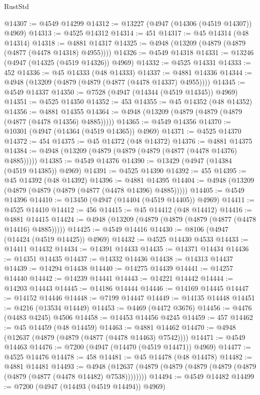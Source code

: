 \begin{lexlean}{RustStd}
\begin{coremodule}
@14307 := @4549 @14299
@14312 := @13227 (@4947 (@14306 (@4519 @14307)) @4969)
@14313 := @4525 @14312
@14314 := 451
@14317 := @45 @14314 (@48 @14314)
@14318 := @4881 @14317
@14325 := @4948 (@13209 (@4879 (@4879 (@4877 (@4478 @14318) @4955))))
@14326 := @4549 @14318
@14331 := @13246 (@4947 (@14325 (@4519 @14326)) @4969)
@14332 := @4525 @14331
@14333 := 452
@14336 := @45 @14333 (@48 @14333)
@14337 := @4881 @14336
@14344 := @4948 (@13209 (@4879 (@4879 (@4877 (@4478 @14337) @4955))))
@14345 := @4549 @14337
@14350 := @7528 (@4947 (@14344 (@4519 @14345)) @4969)
@14351 := @4525 @14350
@14352 := 453
@14355 := @45 @14352 (@48 @14352)
@14356 := @4881 @14355
@14364 := @4948 (@13209 (@4879 (@4879 (@4879 (@4877 (@4478 @14356) @4885)))))
@14365 := @4549 @14356
@14370 := @10301 (@4947 (@14364 (@4519 @14365)) @4969)
@14371 := @4525 @14370
@14372 := 454
@14375 := @45 @14372 (@48 @14372)
@14376 := @4881 @14375
@14384 := @4948 (@13209 (@4879 (@4879 (@4879 (@4877 (@4478 @14376) @4885)))))
@14385 := @4549 @14376
@14390 := @13429 (@4947 (@14384 (@4519 @14385)) @4969)
@14391 := @4525 @14390
@14392 := 455
@14395 := @45 @14392 (@48 @14392)
@14396 := @4881 @14395
@14404 := @4948 (@13209 (@4879 (@4879 (@4879 (@4877 (@4478 @14396) @4885)))))
@14405 := @4549 @14396
@14410 := @13450 (@4947 (@14404 (@4519 @14405)) @4969)
@14411 := @4525 @14410
@14412 := 456
@14415 := @45 @14412 (@48 @14412)
@14416 := @4881 @14415
@14424 := @4948 (@13209 (@4879 (@4879 (@4879 (@4877 (@4478 @14416) @4885)))))
@14425 := @4549 @14416
@14430 := @8106 (@4947 (@14424 (@4519 @14425)) @4969)
@14432 := @4525 @14430 @4533
@14433 := @14411 @14432
@14434 := @14391 @14433
@14435 := @14371 @14434
@14436 := @14351 @14435
@14437 := @14332 @14436
@14438 := @14313 @14437
@14439 := @14294 @14438
@14440 := @14275 @14439
@14441 := @14257 @14440
@14442 := @14239 @14441
@14443 := @14221 @14442
@14444 := @14203 @14443
@14445 := @14186 @14444
@14446 := @14169 @14445
@14447 := @14152 @14446
@14448 := @7199 @14447
@14449 := @14135 @14448
@14451 := @4216 (@13534 @14449)
@14453 := @4469 (@4472 @3676)
@14456 := @4476 (@4483 @4245) @4506
@14458 := @14453 @14456 @4245
@14459 := 457
@14462 := @45 @14459 (@48 @14459)
@14463 := @4881 @14462
@14470 := @4948 (@12637 (@4879 (@4879 (@4877 (@4478 @14463) @7542))))
@14471 := @4549 @14463
@14476 := @7200 (@4947 (@14470 (@4519 @14471)) @4969)
@14477 := @4525 @14476
@14478 := 458
@14481 := @45 @14478 (@48 @14478)
@14482 := @4881 @14481
@14493 := @4948
    (@12637 (@4879 (@4879 (@4879 (@4879 (@4879 (@4879 (@4877 (@4478 @14482) @7538))))))))
@14494 := @4549 @14482
@14499 := @7200 (@4947 (@14493 (@4519 @14494)) @4969)

\end{coremodule}
\end{lexlean}
